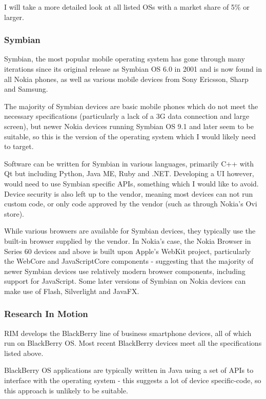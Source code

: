 \documentclass[a4papert,11pt,notitlepage]{ltxdoc}
\begin{document}
I will take a more detailed look at all listed OSs with a market share of 5\% or larger. 

\subsubsection{Symbian}
Symbian, the most popular mobile operating system has gone through many iterations since its original release as Symbian OS 6.0 in 2001 and is now found in all Nokia phones, as well as various mobile devices from Sony Ericsson, Sharp and Samsung.

The majority of Symbian devices are basic mobile phones which do not meet the necessary specifications (particularly a lack of a 3G data connection and large screen), but newer Nokia devices running Symbian OS 9.1 and later seem to be suitable, so this is the version of the operating system which I would likely need to target.

Software can be written for Symbian in various languages, primarily C++ with Qt but including Python, Java ME, Ruby and .NET. Developing a UI however, would need to use Symbian specific APIs, something which I would like to avoid. Device security is also left up to the vendor, meaning most devices can not run custom code, or only code approved by the vendor (such as through Nokia's Ovi store).

While various browsers are available for Symbian devices, they typically use the built-in browser supplied by the vendor. In Nokia's case, the Nokia Browser in Series 60 devices and above is built upon Apple's WebKit project\cite{nokia:browser}, particularly the WebCore and JavaScriptCore components - suggesting that the majority of newer Symbian devices use relatively modern browser components, including support for JavaScript. Some later versions of Symbian on Nokia devices can make use of Flash, Silverlight and JavaFX.

\subsubsection{Research In Motion}
RIM develops the BlackBerry line of business smartphone devices, all of which run on BlackBerry OS. Most recent BlackBerry devices meet all the specifications listed above.

BlackBerry OS applications are typically written in Java using a set of APIs to interface with the operating system - this suggests a lot of device specific-code, so this approach is unlikely to be suitable.
\end{document}
